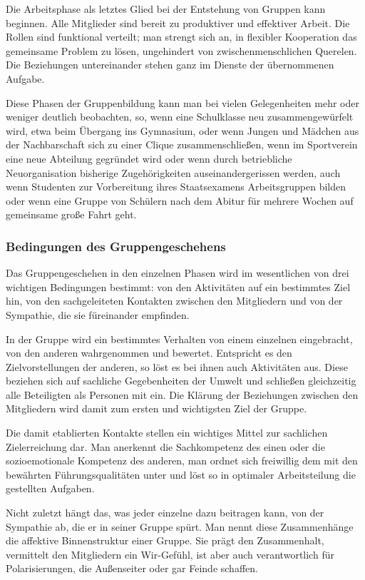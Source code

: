 \documentclass[12pt]{scrartcl}
\begin{document}
Die Arbeitsphase als letztes Glied bei der Entstehung von Gruppen kann
beginnen. Alle Mitglieder sind bereit zu produktiver und effektiver Arbeit. Die
Rollen sind funktional verteilt; man strengt sich an, in flexibler Kooperation
das gemeinsame Problem zu lösen, ungehindert von zwischenmenschlichen Querelen.
Die Beziehungen untereinander stehen ganz im Dienste der übernommenen Aufgabe.

Diese Phasen der Gruppenbildung kann man bei vielen Gelegenheiten mehr oder
weniger deutlich beobachten, so, wenn eine Schulklasse neu zusammengewürfelt
wird, etwa beim Übergang ins Gymnasium, oder wenn Jungen und Mädchen aus der
Nachbarschaft sich zu einer Clique zusammenschließen, wenn im Sportverein eine
neue Abteilung gegründet wird oder wenn durch betriebliche Neuorganisation
bisherige Zugehörigkeiten auseinandergerissen werden, auch wenn Studenten zur
Vorbereitung ihres Staatsexamens Arbeitsgruppen bilden oder wenn eine Gruppe
von Schülern nach dem Abitur für mehrere Wochen auf gemeinsame große Fahrt geht.

\subsubsection{Bedingungen des Gruppengeschehens}
Das Gruppengeschehen in den einzelnen Phasen wird im wesentlichen von drei
wichtigen Bedingungen bestimmt: von den Aktivitäten auf ein bestimmtes Ziel
hin, von den sachgeleiteten Kontakten zwischen den Mitgliedern und von der
Sympathie, die sie füreinander empfinden.

In der Gruppe wird ein bestimmtes Verhalten von einem einzelnen eingebracht,
von den anderen wahrgenommen und bewertet. Entspricht es den Zielvorstellungen
der anderen, so löst es bei ihnen auch Aktivitäten aus. Diese beziehen sich auf
sachliche Gegebenheiten der Umwelt und schließen gleichzeitig alle Beteiligten
als Personen mit ein. Die Klärung der Beziehungen zwischen den Mitgliedern wird
damit zum ersten und wichtigsten Ziel der Gruppe.

Die damit etablierten Kontakte stellen ein wichtiges Mittel zur sachlichen
Zielerreichung dar. Man anerkennt die Sachkompetenz des einen oder die
sozioemotionale Kompetenz des anderen, man ordnet sich freiwillig dem mit den
bewährten Führungsqualitäten unter und löst so in optimaler Arbeitsteilung die
gestellten Aufgaben.

Nicht zuletzt hängt das, was jeder einzelne dazu beitragen kann, von der
Sympathie ab, die er in seiner Gruppe spürt. Man nennt diese Zusammenhänge die
affektive Binnenstruktur einer Gruppe. Sie prägt den Zusammenhalt, vermittelt
den Mitgliedern ein Wir-Gefühl, ist aber auch verantwortlich für
Polarisierungen, die Außenseiter oder gar Feinde schaffen.
\end{document}
